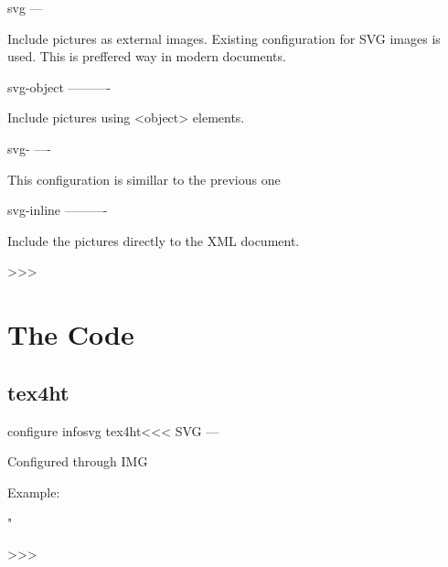 svg
---

Include pictures as external images. Existing configuration for SVG images is 
used. This is preffered way in modern documents.

svg-object
----------

Include pictures using <object> elements.

svg-
----

This configuration is simillar to the previous one

svg-inline
----------

Include the pictures directly to the XML document.

>>>



\chapter{The Code}

\section{tex4ht}

\<configure infosvg tex4ht\><<<
SVG
---

 Configured through IMG

  Example:
      {}
      {}
      {" }
      {}
      {}
>>>




 
 
\endinput


